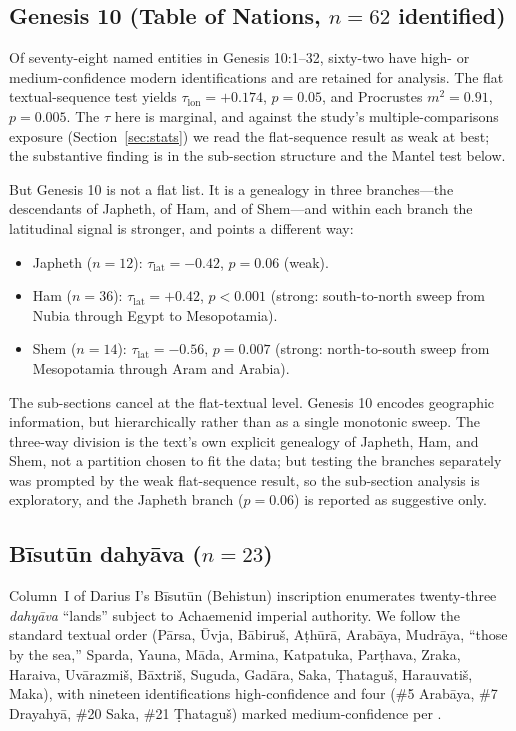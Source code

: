 \documentclass[11pt]{article}
\begin{document}
\subsection{Genesis 10 (Table of Nations, $n=62$ identified)}\label{sec:gen10}

Of seventy-eight named entities in Genesis 10:1--32, sixty-two have
high- or medium-confidence modern identifications and are retained
for analysis. The flat textual-sequence test yields $\tau_\text{lon} =
+0.174$, $p = 0.05$, and Procrustes $m^2 = 0.91$, $p = 0.005$. The
$\tau$ here is marginal, and against the study's multiple-comparisons
exposure (Section~\ref{sec:stats}) we read the flat-sequence result
as weak at best; the substantive finding is in the sub-section
structure and the Mantel test below.

But Genesis 10 is not a flat list. It is a genealogy in three
branches---the descendants of Japheth, of Ham, and of Shem---and
within each branch the latitudinal signal is stronger, and points
a different way:

\begin{itemize}
\item Japheth ($n=12$): $\tau_\text{lat} = -0.42$, $p = 0.06$ (weak).
\item Ham ($n=36$): $\tau_\text{lat} = +0.42$, $p < 0.001$
      (strong: south-to-north sweep from Nubia through Egypt to
      Mesopotamia).
\item Shem ($n=14$): $\tau_\text{lat} = -0.56$, $p = 0.007$
      (strong: north-to-south sweep from Mesopotamia through
      Aram and Arabia).
\end{itemize}

The sub-sections cancel at the flat-textual level. Genesis 10
encodes geographic information, but hierarchically rather than as a
single monotonic sweep. The three-way division is the text's own
explicit genealogy of Japheth, Ham, and Shem, not a partition chosen
to fit the data; but testing the branches separately was prompted by
the weak flat-sequence result, so the sub-section analysis is
exploratory, and the Japheth branch ($p = 0.06$) is reported as
suggestive only.

\subsection{Bīsutūn dahyāva ($n=23$)}\label{sec:bisutun}

Column~I of Darius I's Bīsutūn (Behistun) inscription enumerates
twenty-three \textit{dahyāva} ``lands'' subject to Achaemenid
imperial authority. We follow the standard textual order
\citep{kent1953, schmitt2014} (Pārsa, Ūvja, Bābiruš, A\d{t}h\=ur\=a,
Arabāya, Mudrāya, ``those by the sea,'' Sparda, Yauna, Māda,
Armina, Katpatuka, Par\d{t}hava, Zraka, Haraiva, Uvārazmiš, Bāxtriš,
Suguda, Gadāra, Saka, \d{T}hataguš, Harauvatiš, Maka), with nineteen
identifications high-confidence and four (\#5 Arabāya, \#7 Drayahyā,
\#20 Saka, \#21 \d{T}hataguš) marked medium-confidence per
\citet{briant2002}.
\end{document}
